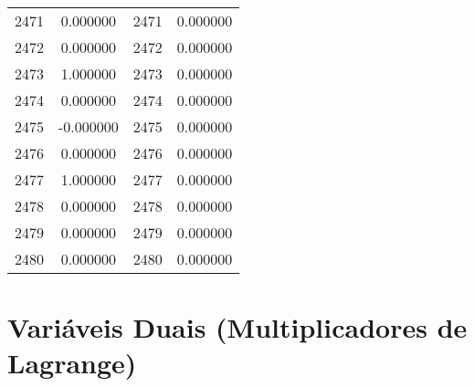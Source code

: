 \documentclass[12pt]{article}
\begin{document}
\begin{longtable}{@{}cccc@{}}
2471 & 0.000000 & 2471 & 0.000000 \\
2472 & 0.000000 & 2472 & 0.000000 \\
2473 & 1.000000 & 2473 & 0.000000 \\
2474 & 0.000000 & 2474 & 0.000000 \\
2475 & -0.000000 & 2475 & 0.000000 \\
2476 & 0.000000 & 2476 & 0.000000 \\
2477 & 1.000000 & 2477 & 0.000000 \\
2478 & 0.000000 & 2478 & 0.000000 \\
2479 & 0.000000 & 2479 & 0.000000 \\
2480 & 0.000000 & 2480 & 0.000000 \\

\end{longtable}

\section{Variáveis Duais (Multiplicadores de Lagrange)}
\end{document}
